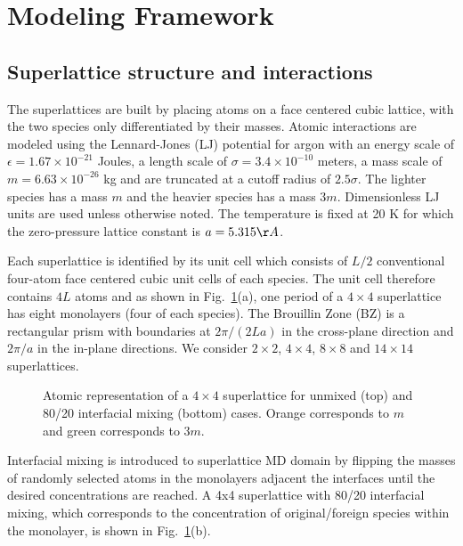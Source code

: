 \documentclass[aps,prb,preprint,preprintnumbers,amsmath,amssymb,floatfix,superscriptaddress]{revtex4}
\begin{document}
\section{Modeling Framework}
\subsection{Superlattice structure and interactions}\label{SEC:sl_struc}
The superlattices are built by placing atoms on a face centered cubic lattice, with the two species only differentiated by their masses. Atomic interactions are modeled using the Lennard-Jones (LJ) potential for argon with an energy scale of $\epsilon= 1.67\times10^{-21}$ Joules, a length scale of $\sigma= 3.4\times10^{-10}$ meters, a mass scale of $m= 6.63\times10^{-26}$ kg and are truncated at a cutoff radius of $2.5\sigma$. The lighter species has a mass $m$ and the heavier species has a mass $3m$. Dimensionless LJ units are used unless otherwise noted. The temperature is fixed at 20 K for which the zero-pressure lattice constant is $a=5.315 \AA$.\cite{mcgaugheythesis}

Each superlattice is identified by its unit cell which consists of $L/2$ conventional four-atom face centered cubic unit cells of each species. The unit cell therefore contains $4L$ atoms and as shown in Fig.~\ref{fig:md_domain}(a), one period of a $4\times4$ superlattice has eight monolayers (four of each species). The Brouillin Zone (BZ) is a rectangular prism with boundaries at $2\pi/(2La)$ in the cross-plane direction and $2\pi/a$ in the in-plane directions. We consider $2\times2$, $4\times4$, $8\times8$ and $14\times14$ superlattices.
\begin{figure}[t!]
\begin{center}
\renewcommand{\figure}{Fig.}
\caption{Atomic representation of a $4\times4$ superlattice for unmixed (top) and 80/20 interfacial mixing (bottom) cases. Orange corresponds to $m$ and green corresponds to $3m$.}
\label{fig:md_domain}
\end{center}
\end{figure}

Interfacial mixing is introduced to superlattice MD domain by flipping the masses of randomly selected atoms in the monolayers adjacent the interfaces until the desired concentrations are reached.\cite{PhysRevB.79.075316} A 4x4 superlattice with 80/20 interfacial mixing, which corresponds to the concentration of original/foreign species within the monolayer, is shown in Fig.~\ref{fig:md_domain}(b).
\end{document}
